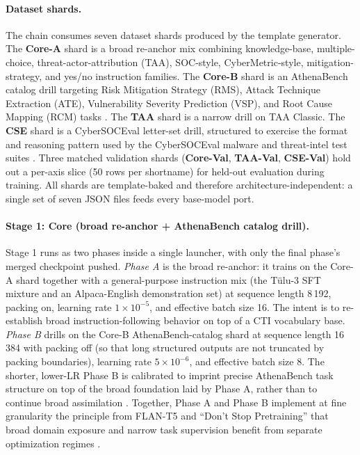 \documentclass[unnumsec,webpdf,contemporary,large]{oup-authoring-template}
\theoremstyle{thmstyleone}
\theoremstyle{thmstyletwo}
\theoremstyle{thmstylethree}
\begin{document}
\paragraph{Dataset shards.}
The chain consumes seven dataset shards produced by the template generator. The \textbf{Core-A} shard is a broad re-anchor mix combining knowledge-base, multiple-choice, threat-actor-attribution (TAA), SOC-style, CyberMetric-style, mitigation-strategy, and yes/no instruction families. The \textbf{Core-B} shard is an AthenaBench catalog drill targeting Risk Mitigation Strategy (RMS), Attack Technique Extraction (ATE), Vulnerability Severity Prediction (VSP), and Root Cause Mapping (RCM) tasks \cite{alam2025athenabench}. The \textbf{TAA} shard is a narrow drill on TAA Classic. The \textbf{CSE} shard is a CyberSOCEval letter-set drill, structured to exercise the format and reasoning pattern used by the CyberSOCEval malware and threat-intel test suites \cite{cybersoceval2025}. Three matched validation shards (\textbf{Core-Val}, \textbf{TAA-Val}, \textbf{CSE-Val}) hold out a per-axis slice (50 rows per shortname) for held-out evaluation during training. All shards are template-baked and therefore architecture-independent: a single set of seven JSON files feeds every base-model port.

\paragraph{Stage 1: Core (broad re-anchor + AthenaBench catalog drill).}
Stage 1 runs as two phases inside a single launcher, with only the final phase's merged checkpoint pushed. \emph{Phase A} is the broad re-anchor: it trains on the Core-A shard together with a general-purpose instruction mix (the Tülu-3 SFT mixture and an Alpaca-English demonstration set) at sequence length 8\,192, packing on, learning rate $1 \times 10^{-5}$, and effective batch size 16. The intent is to re-establish broad instruction-following behavior on top of a CTI vocabulary base. \emph{Phase B} drills on the Core-B AthenaBench-catalog shard at sequence length 16\,384 with packing off (so that long structured outputs are not truncated by packing boundaries), learning rate $5 \times 10^{-6}$, and effective batch size 8. The shorter, lower-LR Phase B is calibrated to imprint precise AthenaBench task structure on top of the broad foundation laid by Phase A, rather than to continue broad assimilation \cite{alam2025athenabench}. Together, Phase A and Phase B implement at fine granularity the principle from FLAN-T5 and ``Don't Stop Pretraining'' that broad domain exposure and narrow task supervision benefit from separate optimization regimes \cite{chung2022flant5,gururangan2020dontstop}.
\end{document}
